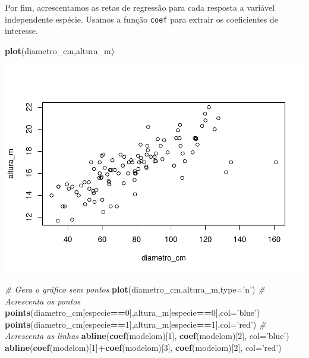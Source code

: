 \documentclass[12pt,brazil,]{book}
\newenvironment{Shaded}{\begin{snugshade}}{\end{snugshade}}
\newcommand{\CommentTok}[1]{\textcolor[rgb]{0.56,0.35,0.01}{\textit{#1}}}
\newcommand{\DataTypeTok}[1]{\textcolor[rgb]{0.13,0.29,0.53}{#1}}
\newcommand{\DecValTok}[1]{\textcolor[rgb]{0.00,0.00,0.81}{#1}}
\newcommand{\KeywordTok}[1]{\textcolor[rgb]{0.13,0.29,0.53}{\textbf{#1}}}
\newcommand{\NormalTok}[1]{#1}
\newcommand{\OperatorTok}[1]{\textcolor[rgb]{0.81,0.36,0.00}{\textbf{#1}}}
\newcommand{\StringTok}[1]{\textcolor[rgb]{0.31,0.60,0.02}{#1}}
\begin{document}
Por fim, acrescentamos as retas de regressão para cada resposta a
variável independente espécie. Usamos a função \texttt{coef} para
extrair os coeficientes de interesse.

\begin{Shaded}
\begin{Highlighting}[]
\KeywordTok{plot}\NormalTok{(diametro_cm,altura_m)}
\end{Highlighting}
\end{Shaded}

\includegraphics{04-RegMult_files/figure-latex/unnamed-chunk-4-1.pdf}

\begin{Shaded}
\begin{Highlighting}[]
\CommentTok{# Gera o gráfico sem pontos}
\KeywordTok{plot}\NormalTok{(diametro_cm,altura_m,}\DataTypeTok{type=}\StringTok{'n'}\NormalTok{) }
\CommentTok{# Acrescenta os pontos}
\KeywordTok{points}\NormalTok{(diametro_cm[especie}\OperatorTok{==}\DecValTok{0}\NormalTok{],altura_m[especie}\OperatorTok{==}\DecValTok{0}\NormalTok{],}\DataTypeTok{col=}\StringTok{'blue'}\NormalTok{)}
\KeywordTok{points}\NormalTok{(diametro_cm[especie}\OperatorTok{==}\DecValTok{1}\NormalTok{],altura_m[especie}\OperatorTok{==}\DecValTok{1}\NormalTok{],}\DataTypeTok{col=}\StringTok{'red'}\NormalTok{)}
\CommentTok{# Acrescenta as linhas}
\KeywordTok{abline}\NormalTok{(}\KeywordTok{coef}\NormalTok{(modelom)[}\DecValTok{1}\NormalTok{], }\KeywordTok{coef}\NormalTok{(modelom)[}\DecValTok{2}\NormalTok{], }\DataTypeTok{col=}\StringTok{'blue'}\NormalTok{)}
\KeywordTok{abline}\NormalTok{(}\KeywordTok{coef}\NormalTok{(modelom)[}\DecValTok{1}\NormalTok{]}\OperatorTok{+}\KeywordTok{coef}\NormalTok{(modelom)[}\DecValTok{3}\NormalTok{], }\KeywordTok{coef}\NormalTok{(modelom)[}\DecValTok{2}\NormalTok{], }\DataTypeTok{col=}\StringTok{'red'}\NormalTok{)}
\end{Highlighting}
\end{Shaded}
\end{document}
